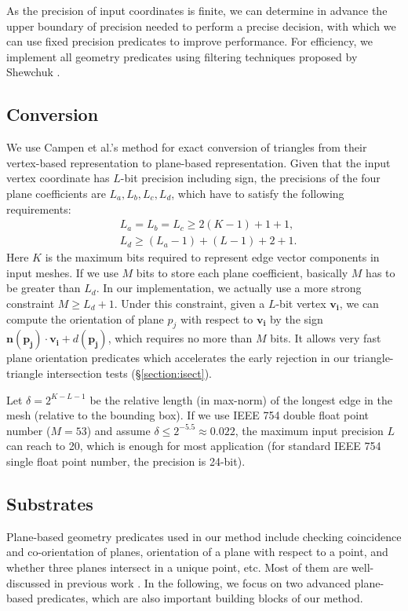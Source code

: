 \documentclass[10pt,journal,compsoc]{IEEEtran}
\begin{document}
As the precision of input coordinates is finite, we can determine in advance the upper boundary of precision needed to perform a precise decision, with which we can use fixed precision predicates to improve performance. For efficiency, we implement all geometry predicates using filtering techniques proposed by Shewchuk \cite{shewchuk1997adaptive}.


\subsection{Conversion}

\label{sec:convert}

We use Campen et al.'s method \cite{campen2010exact} for exact conversion of triangles from their vertex-based representation to plane-based representation. Given that the input vertex coordinate has $L$-bit precision including sign, the precisions of the four plane coefficients are $L_a, L_b, L_c, L_d$, which have to satisfy the following requirements:
\begin{equation}
\begin{split}
&L_a=L_b=L_c\ge 2(K-1)+1+1,\\
&L_d\ge(L_a-1)+(L-1)+2+1.
\end{split}
\end{equation}
Here $K$ is the maximum bits required to represent edge vector components in input meshes. If we use $M$ bits to store each plane coefficient, basically $M$ has to be greater than $L_d$. In our implementation, we actually use a more strong constraint $M \ge L_d+1$. Under this constraint, given a $L$-bit vertex $\bm{v_i}$, we can compute the orientation of plane $p_j$ with respect to $\bm{v_i}$ by the sign $\bm{n}(\bm{p_j})\cdot\bm{v_i} + d(\bm{p_j})$, which requires no more than $M$ bits. It allows very fast plane orientation predicates which accelerates the early rejection in our triangle-triangle intersection tests (\S \ref{section:isect}).


Let $\delta = 2^{K-L-1}$ be the relative length (in max-norm) of the longest edge in the mesh (relative to the bounding box). If we use IEEE 754 double float point number ($M=53$) and assume $\delta \le 2^{-5.5} \approx 0.022$, the maximum input precision $L$ can reach to 20, which is enough for most application (for standard IEEE 754 single float point number, the precision is 24-bit).


\subsection{Substrates}
\label{sec:substrates}
Plane-based geometry predicates used in our method include checking coincidence and co-orientation of planes, orientation of a plane with respect to a point, and whether three planes intersect in a unique point, etc. Most of them are well-discussed in previous work \cite{bernstein2009fast,banerjee1996topologically}. In the following, we focus on two advanced plane-based predicates, which are also important building blocks of our method.
\end{document}
